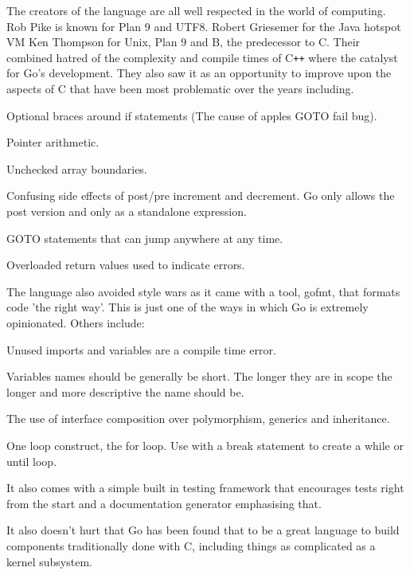 The creators of the language are all well respected in the world of computing.
Rob Pike is known for Plan 9 and UTF8. 
Robert Griesemer for the Java hotspot VM
Ken Thompson for Unix, Plan 9 and B, the predecessor to C.
Their combined hatred of the complexity and compile times of C\verb!++! where the catalyst for Go's development.
They also saw it as an opportunity to improve upon the aspects of C that have been most problematic over the years including\cite{GO-DESIGN-EMAIL}.

\begin{itemize*}
	\item Optional braces around if statements (The cause of apples GOTO fail bug\cite{GOTOFAIL}).
	\item Pointer arithmetic.
    \item Unchecked array boundaries.
	\item Confusing side effects of post/pre increment and decrement. Go only allows the post version and only as a standalone expression.
	\item GOTO statements that can jump anywhere at any time.
    \item Overloaded return values used to indicate errors.
\end{itemize*}

The language also avoided style wars as it came with a tool, gofmt, that formats code 'the right way'.
This is just one of the ways in which Go is extremely opinionated.
Others include:
\begin{itemize*}
	\item Unused imports and variables are a compile time error.
    \item Variables names should be generally be short. The longer they are in scope the longer and more descriptive the name should be.
    \item The use of interface composition over polymorphism, generics and inheritance.
    \item One loop construct, the for loop. Use with a break statement to create a while or until loop.
\end{itemize*}

It also comes with a simple built in testing framework that encourages tests right from the start and a documentation generator emphasising that.


It also doesn't hurt that Go has been found that to be a great language to build components traditionally done with C, including things as complicated as a kernel subsystem\cite{GONET}.

